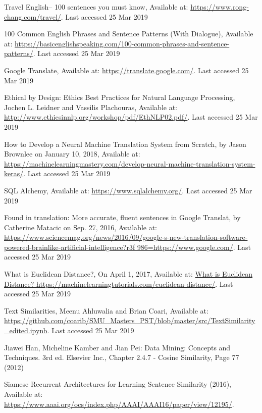 \documentclass[runningheads]{llncs}
\begin{document}
\begin{thebibliography}{8}
	Travel English-- 100 sentences you must know, Available at: \url{https://www.rong-chang.com/travel/}.  Last accessed 25 Mar 2019

	100 Common English Phrases and Sentence Patterns (With Dialogue), Available at: \url{https://basicenglishspeaking.com/100-common-phrases-and-sentence-patterns/}.  Last accessed 25 Mar 2019

	Google Translate, Available at: \url{https://translate.google.com/}.  Last accessed 25 Mar 2019

	Ethical by Design: Ethics Best Practices for Natural Language Processing, Jochen L. Leidner and Vassilis Plachouras, Available at: \url{http://www.ethicsinnlp.org/workshop/pdf/EthNLP02.pdf/}.  Last accessed 25 Mar 2019

How to Develop a Neural Machine Translation System from Scratch, by Jason Brownlee on January 10, 2018, Available at: \url{https://machinelearningmastery.com/develop-neural-machine-translation-system-keras/}.  Last accessed 25 Mar 2019

SQL Alchemy, Available at: \url{https://www.sqlalchemy.org/}.  Last accessed 25 Mar 2019

Found in translation: More accurate, fluent sentences in Google Translat, by Catherine Matacic on Sep. 27, 2016,  Available at:  \url{https://www.sciencemag.org/news/2016/09/google-s-new-translation-software-powered-brainlike-artificial-intelligence?r3f 986=https://www.google.com/}.  Last accessed 25 Mar 2019

What is Euclidean Distance?, On April 1, 2017, Available at:  \url{What is Euclidean Distance?  https://machinelearningtutorials.com/euclidean-distance/}.  Last accessed 25 Mar 2019

Text Similarities, Meenu Ahluwalia and Brian Coari, Available at:  \url{https://github.com/coarib/SMU_Masters_PST/blob/master/src/TextSimilarity_edited.ipynb}.  Last accessed 25 Mar 2019

Jiawei Han, Micheline Kamber and Jian Pei: Data Mining: Concepts and Techniques. 3rd ed. Elsevier Inc., Chapter 2.4.7 - Cosine Similarity, Page 77 (2012)

Siamese Recurrent Architectures for Learning Sentence Similarity (2016), Available at:
\url{https://www.aaai.org/ocs/index.php/AAAI/AAAI16/paper/view/12195/}.


\end{thebibliography}
\end{document}
